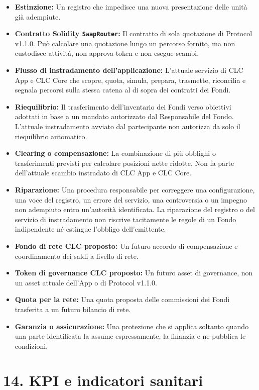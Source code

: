 \documentclass[11pt]{article}
\begin{document}
\begin{itemize}[leftmargin=*]
\item \textbf{Estinzione:} Un registro che impedisce una nuova presentazione delle unità già adempiute.
\item \textbf{Contratto Solidity \texttt{SwapRouter}:} Il contratto di sola quotazione di Protocol v1.1.0. Può calcolare una quotazione lungo un percorso fornito, ma non custodisce attività, non approva token e non esegue scambi.
\item \textbf{Flusso di instradamento dell'applicazione:} L'attuale servizio di CLC App e CLC Core che scopre, quota, simula, prepara, trasmette, riconcilia e segnala percorsi sulla stessa catena al di sopra dei contratti dei Fondi.
\item \textbf{Riequilibrio:} Il trasferimento dell'inventario dei Fondi verso obiettivi adottati in base a un mandato autorizzato dal Responsabile del Fondo. L'attuale instradamento avviato dal partecipante non autorizza da solo il riequilibrio automatico.
\item \textbf{Clearing o compensazione:} La combinazione di più obblighi o trasferimenti previsti per calcolare posizioni nette ridotte. Non fa parte dell'attuale scambio instradato di CLC App e CLC Core.
\item \textbf{Riparazione:} Una procedura responsabile per correggere una configurazione, una voce del registro, un errore del servizio, una controversia o un impegno non adempiuto entro un'autorità identificata. La riparazione del registro o del servizio di instradamento non riscrive tacitamente le regole di un Fondo indipendente né estingue l'obbligo dell'emittente.
\item \textbf{Fondo di rete CLC proposto:} Un futuro accordo di compensazione e coordinamento dei saldi a livello di rete.
\item \textbf{Token di governance CLC proposto:} Un futuro asset di governance, non un asset attuale dell'App o di Protocol v1.1.0.
\item \textbf{Quota per la rete:} Una quota proposta delle commissioni dei Fondi trasferita a un futuro bilancio di rete.
\item \textbf{Garanzia o assicurazione:} Una protezione che si applica soltanto quando una parte identificata la assume espressamente, la finanzia e ne pubblica le condizioni.
\end{itemize}

\section*{14. KPI e indicatori sanitari}
\end{document}
